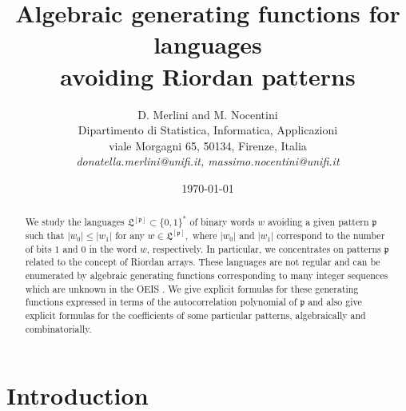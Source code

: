\documentclass[12pt]{article}
\begin{document}
\title{Algebraic generating functions for languages \\ avoiding Riordan patterns}
\author{D. Merlini and M. Nocentini\\
Dipartimento di Statistica, Informatica, Applicazioni \\ 
viale Morgagni 65, 50134, Firenze, Italia \\ 
{\sl donatella.merlini@unifi.it, massimo.nocentini@unifi.it}}
\date{\today}
\maketitle
\begin{abstract}

We study the languages  $\mathfrak{L}^{[\mathfrak{p}]}\subset \{0,1\}^*$ of
binary words $w$ avoiding a given pattern $\mathfrak{p}$ such that $|w_0|\leq
|w_1|$ for any $w\in \mathfrak{L}^{[\mathfrak{p}]},$ where  $|w_0|$ and $|w_1|$
correspond to the number of bits $1$ and $0$ in the word $w$, respectively.  In
particular, we concentrates on  patterns $\mathfrak{p}$ related to the concept
of Riordan arrays. These languages are not regular and can be enumerated by
algebraic generating functions corresponding to many integer sequences which
are unknown in the OEIS .  We give explicit formulas for these generating
functions expressed in terms of the autocorrelation polynomial of
$\mathfrak{p}$ and also give explicit formulas for the coefficients of some
particular patterns, algebraically and combinatorially. 

\end{abstract}

\section{Introduction}


%
%
\end{document}
